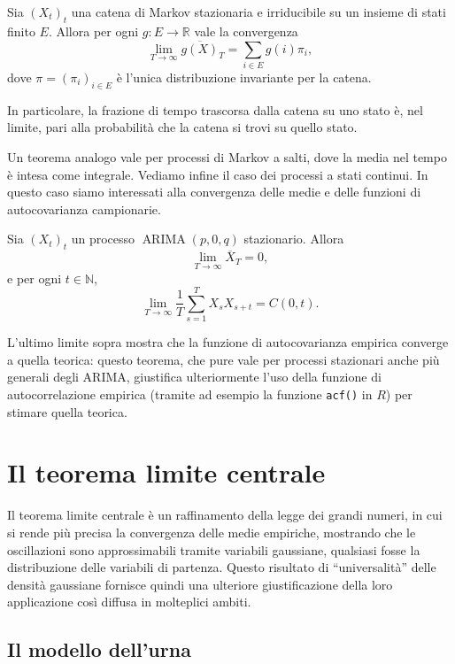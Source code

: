 \documentclass[
  italian,
  letterpaper,
]{book}
\newcommand{\R}{\mathbb{R}}
\theoremstyle{definition}
\theoremstyle{remark}
\begin{document}
Sia \((X_t)_{t}\) una catena di Markov stazionaria e irriducibile su un
insieme di stati finito \(E\). Allora per ogni \(g: E  \to \R\) vale la
convergenza
\[ \lim_{ T \to \infty} \overline{g(X)}_T =  \sum_{i \in E} g(i) \pi_i,\]
dove \(\pi = (\pi_i)_{i\in E}\) è l'unica distribuzione invariante per
la catena.

In particolare, la frazione di tempo trascorsa dalla catena su uno stato
è, nel limite, pari alla probabilità che la catena si trovi su quello
stato.

Un teorema analogo vale per processi di Markov a salti, dove la media
nel tempo è intesa come integrale. Vediamo infine il caso dei processi a
stati continui. In questo caso siamo interessati alla convergenza delle
medie e delle funzioni di autocovarianza campionarie.

Sia \((X_t)_{t}\) un processo \(\operatorname{ARIMA}(p,0,q)\)
stazionario. Allora \[ \lim_{T \to \infty} \overline{X}_T = 0,\] e per
ogni \(t\in \mathbb{N}\),
\[ \lim_{T \to \infty} \frac 1 T \sum_{s=1}^T X_s X_{s+t} = C(0,t).\]

L'ultimo limite sopra mostra che la funzione di autocovarianza empirica
converge a quella teorica: questo teorema, che pure vale per processi
stazionari anche più generali degli ARIMA, giustifica ulteriormente
l'uso della funzione di autocorrelazione empirica (tramite ad esempio la
funzione \texttt{acf()} in \(R\)) per stimare quella teorica.

\section{Il teorema limite centrale}\label{sec-clt}

Il teorema limite centrale è un raffinamento della legge dei grandi
numeri, in cui si rende più precisa la convergenza delle medie
empiriche, mostrando che le oscillazioni sono approssimabili tramite
variabili gaussiane, qualsiasi fosse la distribuzione delle variabili di
partenza. Questo risultato di ``universalità'' delle densità gaussiane
fornisce quindi una ulteriore giustificazione della loro applicazione
così diffusa in molteplici ambiti.

\subsection{Il modello dell'urna}\label{il-modello-dellurna}
\end{document}
